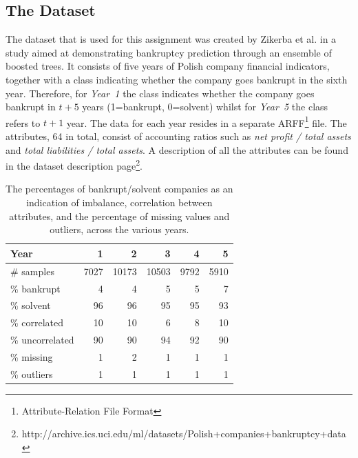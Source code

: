 \documentclass{article}[paper=a4,pagesize=auto,10pt]
\begin{document}
\subsection{The Dataset} \label{The Dataset}

The dataset that is used for this assignment was created by Zikerba et al. \cite{zikeba2016ensemble} in a study aimed at demonstrating bankruptcy prediction through an ensemble of boosted trees. It consists of five years of Polish company financial indicators, together with a class indicating whether the company goes bankrupt in the sixth year.  Therefore, for \textit{Year~1} the class indicates whether the company goes bankrupt in $t+5$ years (1=bankrupt, 0=solvent) whilst for \textit{Year~5} the class refers to $t+1$ year. The data for each year resides in a separate ARFF\footnote{Attribute-Relation File Format} file. The attributes, 64 in total, consist of accounting ratios such as \textit{net profit / total assets} and \textit{total liabilities / total assets}. A description of all the attributes can be found in the dataset description page\footnote{http://archive.ics.uci.edu/ml/datasets/Polish+companies+bankruptcy+data}.\medskip

\begin{table}[ht]
\centering
\begin{tabular}{lrrrrr}
\toprule
Year            &     1 &      2 &      3 &     4 &     5 \\
\midrule
\# samples      &  7027 &  10173 &  10503 &  9792 &  5910 \\
\addlinespace[0.2cm]
\% bankrupt     &     4 &      4 &      5 &     5 &     7 \\
\% solvent      &    96 &     96 &     95 &    95 &    93 \\
\addlinespace[0.2cm]
\% correlated   &    10 &     10 &     6 &    8 &    10 \\
\% uncorrelated &    90 &     90 &     94 &    92 &    90 \\
\addlinespace[0.2cm]
\% missing      &     1 &      2 &      1 &     1 &     1 \\
\% outliers     &     1 &      1 &      1 &     1 &     1 \\

\bottomrule
\end{tabular}
\caption{The percentages of bankrupt/solvent companies as an indication of imbalance, correlation between attributes, and the percentage of missing values and outliers, across the various years.}
\label{tab:dataset}
\end{table}
\end{document}
